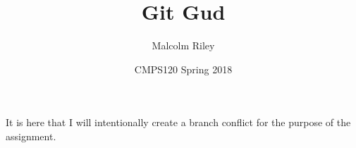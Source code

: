 \documentclass[12pt]{article}
\title{\textbf{Git Gud}}
\author{Malcolm Riley}
\date{CMPS120 Spring 2018}
\begin{document}
\maketitle

It is here that I will intentionally create a branch conflict for the purpose of the assignment.
\end{document}
